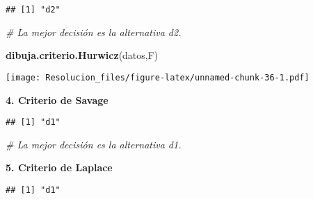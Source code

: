 \documentclass[
]{article}
\newenvironment{Shaded}{\begin{snugshade}}{\end{snugshade}}
\newcommand{\CommentTok}[1]{\textcolor[rgb]{0.56,0.35,0.01}{\textit{#1}}}
\newcommand{\FunctionTok}[1]{\textcolor[rgb]{0.13,0.29,0.53}{\textbf{#1}}}
\newcommand{\NormalTok}[1]{#1}
\newcommand{\OtherTok}[1]{\textcolor[rgb]{0.56,0.35,0.01}{#1}}
\newcommand{\SpecialCharTok}[1]{\textcolor[rgb]{0.81,0.36,0.00}{\textbf{#1}}}
\begin{document}
\begin{verbatim}
## [1] "d2"
\end{verbatim}

\begin{Shaded}
\begin{Highlighting}[]
\CommentTok{\# La mejor decisión es la alternativa d2.}
\end{Highlighting}
\end{Shaded}

\begin{Shaded}
\begin{Highlighting}[]
\FunctionTok{dibuja.criterio.Hurwicz}\NormalTok{(datos,F)}
\end{Highlighting}
\end{Shaded}

\texttt{[image: Resolucion\_files/figure-latex/unnamed-chunk-36-1.pdf]}

\textbf{4. Criterio de Savage}

\begin{Shaded}
\end{Shaded}

\begin{verbatim}
## [1] "d1"
\end{verbatim}

\begin{Shaded}
\begin{Highlighting}[]
\CommentTok{\# La mejor decisión es la alternativa d1.}
\end{Highlighting}
\end{Shaded}

\textbf{5. Criterio de Laplace}

\begin{Shaded}
\end{Shaded}

\begin{verbatim}
## [1] "d1"
\end{verbatim}
\end{document}
